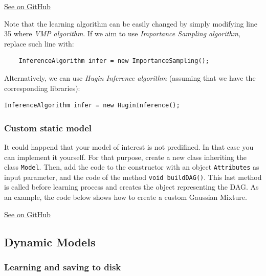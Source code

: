 \documentclass[10pt,a4paper]{article}
\begin{document}
\href{https://github.com/amidst/tutorial/blob/master/src/main/java/eu/amidst/tutorial/usingAmidst/examples/StaticModelInference.java}{See on GitHub}

Note that the learning algorithm can be easily changed by simply modifying line 35 where \textit{VMP algorithm}. If we aim to use \textit{Importance Sampling algorithm}, replace such line with:

\begin{verbatim}
	InferenceAlgorithm infer = new ImportanceSampling();
\end{verbatim}  

Alternatively, we can use \textit{Hugin Inference algorithm} (assuming that we have the corresponding libraries):

\begin{verbatim}
InferenceAlgorithm infer = new HuginInference();
\end{verbatim}  



\subsubsection{Custom static model}\label{sec:lvmodels:static:custom}

It could happend that your model of interest is not predifined. In that case you can implement it yourself. For that purpose, create a new class inheriting the class \texttt{Model}. Then, add the code to the constructor with an object \texttt{Attributes} as input parameter, and the code of the method \texttt{void buildDAG()}. This last method is called before learning process and creates the object representing the DAG. As an example, the code below shows how to create a custom Gaussian Mixture.


\href{https://github.com/amidst/tutorial/blob/master/src/main/java/eu/amidst/tutorial/usingAmidst/practice/CustomGaussianMixture.java}{See on GitHub}


\subsection{Dynamic Models}\label{sec:lvmodels:dynamic}
\subsubsection{ Learning and saving to disk }\label{sec:lvmodels:dynamic:learning}
\end{document}
